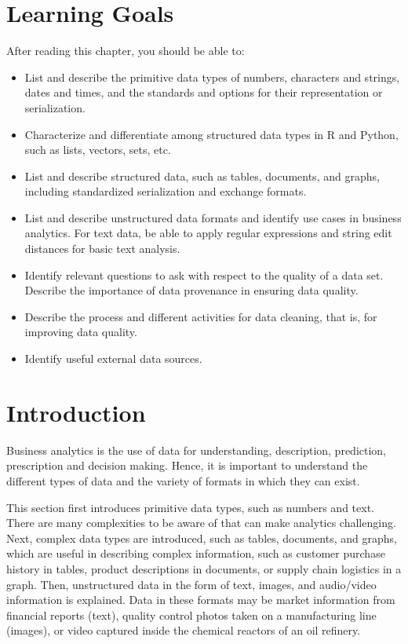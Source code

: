 %
%
\section*{Learning Goals}

After reading this chapter, you should be able to:
\begin{itemize}
  \item List and describe the primitive data types of numbers, characters and strings, dates and times, and the standards and options for their representation or serialization.
  \item Characterize and differentiate among structured data types in R and Python, such as lists, vectors, sets, etc. 
  \item List and describe structured data, such as tables, documents, and graphs, including standardized serialization and exchange formats.
  \item List and describe unstructured data formats and identify use cases in business analytics. For text data, be able to apply regular expressions and string edit distances for basic text analysis.
  \item Identify relevant questions to ask with respect to the quality of a data set. Describe the importance of data provenance in ensuring data quality.
  \item Describe the process and different activities for data cleaning, that is, for improving data quality.
  \item Identify useful external data sources. 
\end{itemize}

\section{Introduction}

Business analytics is the use of data for understanding, description, prediction, prescription and decision making. Hence, it is important to understand the different types of data and the variety of formats in which they can exist. 

This section first introduces primitive data types, such as numbers and text. There are many complexities to be aware of that can make analytics challenging. Next, complex data types are introduced, such as tables, documents, and graphs, which are useful in describing complex information, such as customer purchase history in tables, product descriptions in documents, or supply chain logistics in a graph. Then, unstructured data in the form of text, images, and audio/video information is explained. Data in these formats may be market information from financial reports (text), quality control photos taken on a manufacturing line (images), or video captured inside the chemical reactors of an oil refinery.

